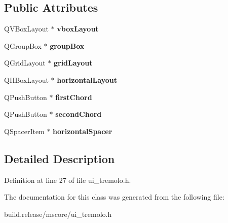 \subsection*{Public Attributes}
\begin{DoxyCompactItemize}
\item 
\mbox{\label{class_ui___tremolo_base_a8c71c7455f346807dcc260476396a074}} 
Q\+V\+Box\+Layout $\ast$ {\bfseries vbox\+Layout}
\item 
\mbox{\label{class_ui___tremolo_base_a68e31aa10857b3e3b13862b5eca9a8cd}} 
Q\+Group\+Box $\ast$ {\bfseries group\+Box}
\item 
\mbox{\label{class_ui___tremolo_base_ab38dfeb383790e7e68691fe09f48752c}} 
Q\+Grid\+Layout $\ast$ {\bfseries grid\+Layout}
\item 
\mbox{\label{class_ui___tremolo_base_a8dc28aeb5a87ab2bf48a4a93e4afcce8}} 
Q\+H\+Box\+Layout $\ast$ {\bfseries horizontal\+Layout}
\item 
\mbox{\label{class_ui___tremolo_base_ad945745f151571ae9b4a8092c6a030ad}} 
Q\+Push\+Button $\ast$ {\bfseries first\+Chord}
\item 
\mbox{\label{class_ui___tremolo_base_a87af3a65e169d176bee2216415a21f3b}} 
Q\+Push\+Button $\ast$ {\bfseries second\+Chord}
\item 
\mbox{\label{class_ui___tremolo_base_ad87cac8f519efc90a3706edf8b435e46}} 
Q\+Spacer\+Item $\ast$ {\bfseries horizontal\+Spacer}
\end{DoxyCompactItemize}


\subsection{Detailed Description}


Definition at line 27 of file ui\+\_\+tremolo.\+h.



The documentation for this class was generated from the following file\+:\begin{DoxyCompactItemize}
\item 
build.\+release/mscore/ui\+\_\+tremolo.\+h\end{DoxyCompactItemize}
